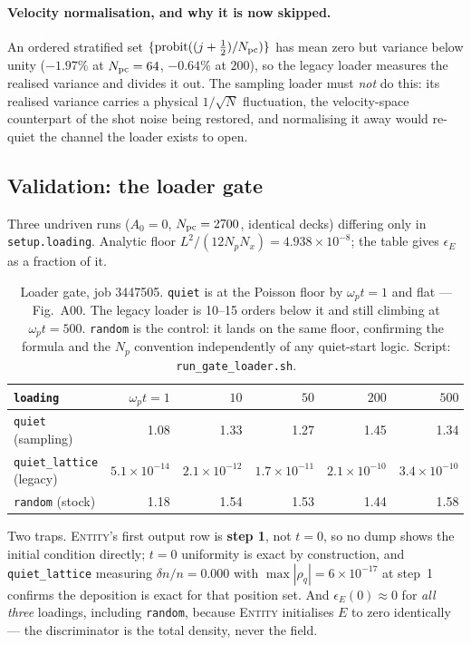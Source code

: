 \documentclass[11pt,a4paper]{article}
\newcommand{\code}[1]{\texttt{\small #1}}
\newcommand{\wpt}{\omega_p t}
\newcommand{\Npc}{N_{\rm pc}}
\begin{document}
\paragraph{Velocity normalisation, and why it is now skipped.} An ordered stratified
set $\{\mathrm{probit}((j+\tfrac12)/\Npc)\}$ has mean zero but variance below unity
($-1.97\%$ at $\Npc=64$, $-0.64\%$ at $200$), so the legacy loader measures the
realised variance and divides it out. The sampling loader must \emph{not} do this:
its realised variance carries a physical $1/\sqrt{N}$ fluctuation, the velocity-space
counterpart of the shot noise being restored, and normalising it away would re-quiet
the channel the loader exists to open.

\subsection{Validation: the loader gate}
\label{sec:quietval}

Three undriven runs ($A_0=0$, $\Npc = 2700$, identical decks) differing only in
\code{setup.loading}. Analytic floor $L^2/(12N_pN_x) = 4.938\times10^{-8}$; the table
gives $\epsilon_E$ as a fraction of it.

\begin{table}[h]
\centering\small
\begin{tabular}{@{}lrrrrr@{}}
\toprule
\code{loading} & $\wpt=1$ & $10$ & $50$ & $200$ & $500$ \\
\midrule
\code{quiet} (sampling)        & 1.08 & 1.33 & 1.27 & 1.45 & 1.34 \\
\code{quiet\_lattice} (legacy) & $5.1\times10^{-14}$ & $2.1\times10^{-12}$ &
                                 $1.7\times10^{-11}$ & $2.1\times10^{-10}$ &
                                 $3.4\times10^{-10}$ \\
\code{random} (stock)          & 1.18 & 1.54 & 1.53 & 1.44 & 1.58 \\
\bottomrule
\end{tabular}
\caption{Loader gate, job 3447505. \code{quiet} is at the Poisson floor by
$\wpt=1$ and flat --- Fig.~A00. The legacy loader is 10--15 orders below it and
still climbing at $\wpt=500$. \code{random} is the control: it lands on the same
floor, confirming the formula and the $N_p$ convention independently of any
quiet-start logic. Script: \code{run\_gate\_loader.sh}.}
\end{table}

Two traps. \textsc{Entity}'s first output row is \textbf{step 1}, not $t=0$, so no
dump shows the initial condition directly; $t=0$ uniformity is exact by construction,
and \code{quiet\_lattice} measuring $\delta n/n = 0.000$ with
$\max|\rho_q| = 6\times10^{-17}$ at step~1 confirms the deposition is exact for that
position set. And $\epsilon_E(0)\approx 0$ for \emph{all three} loadings, including
\code{random}, because \textsc{Entity} initialises $E$ to zero identically --- the
discriminator is the total density, never the field.
\end{document}
